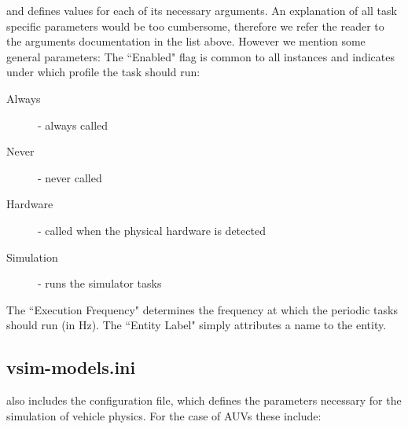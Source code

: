 \documentclass[10pt,a4paper]{article}
\begin{document}
and defines values for each of its necessary arguments. An explanation of all task specific parameters would be too cumbersome, therefore we refer the reader to the arguments documentation in the list above. However we mention some general parameters:
The ``Enabled" flag is common to all instances and indicates under which profile the task should run: 
\begin{description}
\item[Always] - always called
\item[Never] - never called
\item[Hardware] - called when the physical hardware is detected
\item[Simulation] - runs the simulator tasks
\end{description}
The ``Execution Frequency" determines the frequency at which the periodic tasks should run (in Hz). The ``Entity Label" simply attributes a name to the entity. 


\subsection{vsim-models.ini}
\label{vsim_models_ini}

\par {} also includes the  configuration file, which defines the parameters necessary for the simulation of vehicle physics. For the case of AUVs these include:
\end{document}

